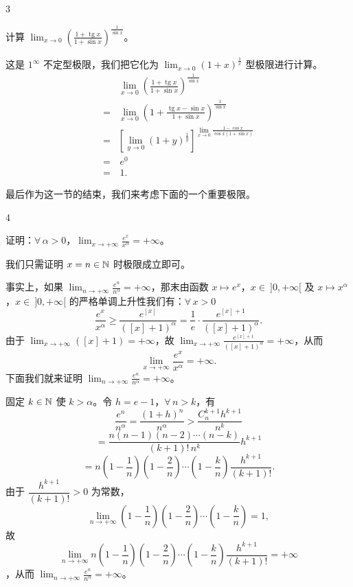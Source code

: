 \begin{sourceexample}{3}

	计算 \(\displaystyle\lim_{x\to0}\left(\frac{1+\operatorname{tg}x}{1+\sin x}\right)^{\frac1{\sin x}}\)。

	这是 \(1^\infty\) 不定型极限，我们把它化为 \(\displaystyle\lim_{x\to0}(1+x)^{\frac1x}\) 型极限进行计算。
	\[
	\begin{aligned}
	&\lim_{x\to0}\left(\frac{1+\operatorname{tg}x}{1+\sin x}\right)^{\frac1{\sin x}}\\
	=&\lim_{x\to0}\left(1+\frac{\operatorname{tg}x-\sin x}{1+\sin x}\right)^{\frac1{\sin x}}\\
	=&\left[\lim_{y\to0}(1+y)^{\frac1y}\right]^{\lim_{x\to0}\frac{1-\cos x}{\cos x(1+\sin x)}}\\
	=&\,e^0\\
	=&\,1.
	\end{aligned}
	\]

\end{sourceexample}

最后作为这一节的结束，我们来考虑下面的一个重要极限。

\begin{sourceexample}{4}

	证明：\(\forall\,\alpha>0\)，\(\displaystyle\lim_{x\to+\infty}\frac{e^x}{x^\alpha}=+\infty\)。

	我们只需证明 \(x=n\in\mathbb{N}\) 时极限成立即可。

	事实上，如果 \(\displaystyle\lim_{n\to+\infty}\frac{e^n}{n^\alpha}=+\infty\)，那末由函数 \(x\longmapsto e^x\)，\(x\in\ ]0,+\infty[\) 及 \(x\longmapsto x^\alpha\)，\(x\in\ ]0,+\infty[\) 的严格单调上升性我们有：\(\forall\,x>0\)
	\[
	\frac{e^x}{x^\alpha}\ge\frac{e^{[x]}}{([x]+1)^\alpha}=\frac1e\cdot\frac{e^{[x]+1}}{([x]+1)^\alpha}.
	\]
	由于 \(\displaystyle\lim_{x\to+\infty}([x]+1)=+\infty\)，故 \(\displaystyle\lim_{x\to+\infty}\frac{e^{[x]+1}}{([x]+1)^\alpha}=+\infty\)，从而
	\[
	\lim_{x\to+\infty}\frac{e^x}{x^\alpha}=+\infty.
	\]
	下面我们就来证明 \(\displaystyle\lim_{n\to+\infty}\frac{e^n}{n^\alpha}=+\infty\)。

	固定 \(k\in\mathbb{N}\) 使 \(k>\alpha\)。令 \(h=e-1\)，\(\forall\,n>k\)，有
	\[
	\frac{e^n}{n^\alpha}=\frac{(1+h)^n}{n^\alpha}>\frac{C_n^{k+1}h^{k+1}}{n^k}
	\]
	\[
	=\frac{n(n-1)(n-2)\cdots(n-k)}{(k+1)!\,n^k}h^{k+1}
	\]
	\[
	=n\left(1-\frac1n\right)\left(1-\frac2n\right)\cdots\left(1-\frac kn\right)\frac{h^{k+1}}{(k+1)!}.
	\]
	由于 \(\dfrac{h^{k+1}}{(k+1)!}>0\) 为常数，
	\[
	\lim_{n\to+\infty}\left(1-\frac1n\right)\left(1-\frac2n\right)\cdots\left(1-\frac kn\right)=1,
	\]
	故
	\[
	\lim_{n\to+\infty}n\left(1-\frac1n\right)\left(1-\frac2n\right)\cdots\left(1-\frac kn\right)\frac{h^{k+1}}{(k+1)!}=+\infty
	\]
	，从而 \(\displaystyle\lim_{n\to+\infty}\frac{e^n}{n^\alpha}=+\infty\)。

\end{sourceexample}


